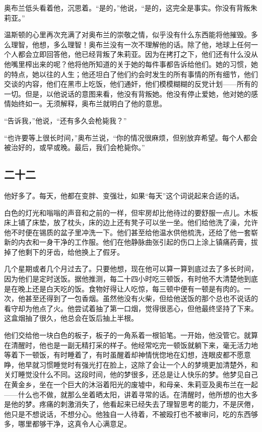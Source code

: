 奥布兰低头看着他，沉思着。``是的，''他说，``是的，这完全是事实。你没有背叛朱莉亚。''

温斯顿的心里再次充满了对奥布兰的崇敬之情，似乎没有什么东西能将他摧毁。多么理智，他想，多么理智！奥布兰没有一次不理解他的话。除了他，地球上任何一个人都会立即回答他，他已经背叛了朱莉亚。因为在拷打之下，他们还有什么没从他嘴里榨出来的呢？他将他所知道的关于她的每件事都告诉给他们。她的习惯，她的特点，她以往的人生；他还坦白了他们约会时发生的所有事情的所有细节，他们交谈的内容，他们在黑市上吃饭，他们通奸，他们模模糊糊的反党计划------所有的一切。但是，以他说话的意图来看，他没有背叛她。他没有停止爱她，他对她的感情始终如一。无须解释，奥布兰就明白了他的意思。

``告诉我，''他说，``还有多久会枪毙我？''

``也许要等上很长时间，''奥布兰说，``你的情况很麻烦，但别放弃希望。每个人都会被治好的，或早或晚。最后，我们会枪毙你。''

\subsection{二十二}\label{ux4e8cux5341ux4e8c}

他好多了。每天，他都在变胖、变强壮，如果``每天''这个词说起来合适的话。

白色的灯光和嗡嗡的声音和之前的一样，但牢房却比他待过的要舒服一点儿。木板床上铺了床垫，放了枕头，床的边上还有凳子可以坐一坐。他们给他洗了澡，允许他不时便在锡质的盆子里冲洗一下。他们甚至给他温水供他梳洗，还给了他一套崭新的内衣和一身干净的工作服。他们在他静脉曲张引起的伤口上涂上镇痛药膏，拔掉了他剩下的牙齿，给他换上了假牙。

几个星期或者几个月过去了。只要他想，现在他可以算一算到底过去了多长时间，因为他们是定时送饭。据他推测，每二十四小时吃三顿饭，有时他不大清楚他到底是在晚上还是白天吃的饭。食物好得让人吃惊，每三顿中便有一顿是有肉的。一次，他甚至还得到了一包香烟。虽然他没有火柴，但给他送饭的那个总也不说话的看守却为他点了火。他尝试着抽了第一口烟，觉得很恶心，但他最终坚持了下来。这盒烟抽了很久，他总会在饭后抽上半根。

他们交给他一块白色的板子，板子的一角系着一根铅笔。一开始，他没管它。就算在清醒时，他也是一副无精打采的样子。他经常吃完一顿饭就躺下来，毫无活力地等着下一顿饭，有时睡着了，有时虽醒着却神情恍惚地在幻想，连眼皮都不愿意睁，他早就习惯睡觉时有强光打在脸上，这除了会让一个人的梦境更加清楚外，和关灯睡觉没什么不同。这段时间，他的梦很多，还总是让人快乐的梦。他梦见自己在黄金乡，坐在一个巨大的沐浴着阳光的废墟中，和母亲、朱莉亚及奥布兰在一起------什么也不做，就那么坐着晒太阳，讲着寻常的话。在清醒时，他所想的也大多是他的梦。疼痛的刺激消失了，他看起来已经失去了理智思考的能力，不是厌倦，他只是不想说话，不想分心。他独自一人待着，不被殴打也不被审问，吃的东西够多，哪里都够干净，这真令人心满意足。

